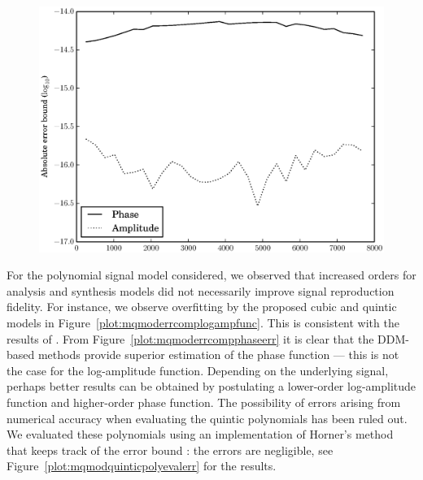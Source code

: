 \begin{figure}[!t]
    \centering
    \includegraphics[width=\figwidthscale\textwidth]{plots/mq_mod_quintic_poly_eval_err.eps}
\end{figure}

For the polynomial signal model considered, we observed that increased orders
for analysis and synthesis models did not necessarily improve signal
reproduction fidelity. For instance, we observe overfitting by the proposed
cubic and quintic models in Figure~\ref{plot:mqmoderrcomplogampfunc}.  This is
consistent with the results of \cite{girin2003comparing}. From
Figure~\ref{plot:mqmoderrcompphaseerr} it is clear that the DDM-based methods
provide superior estimation of the phase function --- this is not the case for
the log-amplitude function. Depending on the underlying signal, perhaps better
results can be obtained by postulating a lower-order log-amplitude function and
higher-order phase function. The possibility of errors arising from numerical
accuracy when evaluating the quintic polynomials has been ruled out.  We
evaluated these polynomials using an implementation of Horner's method that
keeps track of the error bound \cite[p.~95]{higham2002accuracy}: the errors are
negligible, see Figure~\ref{plot:mqmodquinticpolyevalerr} for the results.

